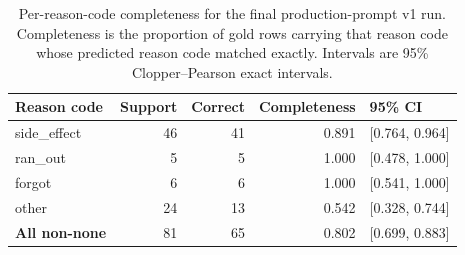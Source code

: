 \begin{table}[htbp]
  \centering
  \caption{Per-reason-code completeness for the final production-prompt v1 run. Completeness is the proportion of gold rows carrying that reason code whose predicted reason code matched exactly. Intervals are 95\% Clopper--Pearson exact intervals.}
  \label{tab:reason-completeness}
  \begin{tabular}{lrrrl}
    \toprule
    Reason code & Support & Correct & Completeness & 95\% CI \\
    \midrule
    side\_effect & 46 & 41 & 0.891 & [0.764, 0.964] \\
    ran\_out & 5 & 5 & 1.000 & [0.478, 1.000] \\
    forgot & 6 & 6 & 1.000 & [0.541, 1.000] \\
    other & 24 & 13 & 0.542 & [0.328, 0.744] \\
    \midrule
    \textbf{All non-none} & 81 & 65 & 0.802 & [0.699, 0.883] \\
    \bottomrule
  \end{tabular}
\end{table}
